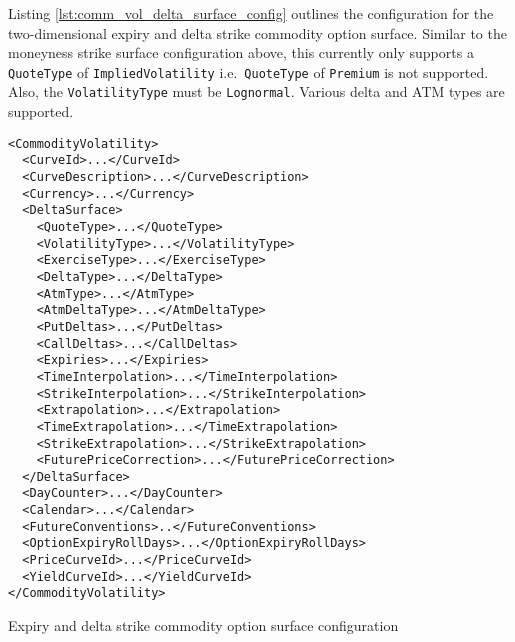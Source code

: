 Listing \ref{lst:comm_vol_delta_surface_config} outlines the configuration for the two-dimensional expiry and delta strike commodity option surface. Similar to the moneyness strike surface configuration above, this currently only supports a \lstinline!QuoteType! of \lstinline!ImpliedVolatility! i.e.\ \lstinline!QuoteType! of \lstinline!Premium! is not supported. Also, the \lstinline!VolatilityType! must be \lstinline!Lognormal!. Various delta and ATM types are supported.

\begin{longlisting}
\begin{verbatim}
<CommodityVolatility>
  <CurveId>...</CurveId>
  <CurveDescription>...</CurveDescription>
  <Currency>...</Currency>
  <DeltaSurface>
    <QuoteType>...</QuoteType>
    <VolatilityType>...</VolatilityType>
    <ExerciseType>...</ExerciseType>
    <DeltaType>...</DeltaType>
    <AtmType>...</AtmType>
    <AtmDeltaType>...</AtmDeltaType>
    <PutDeltas>...</PutDeltas>
    <CallDeltas>...</CallDeltas>
    <Expiries>...</Expiries>
    <TimeInterpolation>...</TimeInterpolation>
    <StrikeInterpolation>...</StrikeInterpolation>
    <Extrapolation>...</Extrapolation>
    <TimeExtrapolation>...</TimeExtrapolation>
    <StrikeExtrapolation>...</StrikeExtrapolation>
    <FuturePriceCorrection>...</FuturePriceCorrection>
  </DeltaSurface>
  <DayCounter>...</DayCounter>
  <Calendar>...</Calendar>
  <FutureConventions>..</FutureConventions>
  <OptionExpiryRollDays>...</OptionExpiryRollDays>
  <PriceCurveId>...</PriceCurveId>
  <YieldCurveId>...</YieldCurveId>
</CommodityVolatility>
\end{verbatim}
\caption{Expiry and delta strike commodity option surface configuration}
\label{lst:comm_vol_delta_surface_config}
\end{longlisting}

